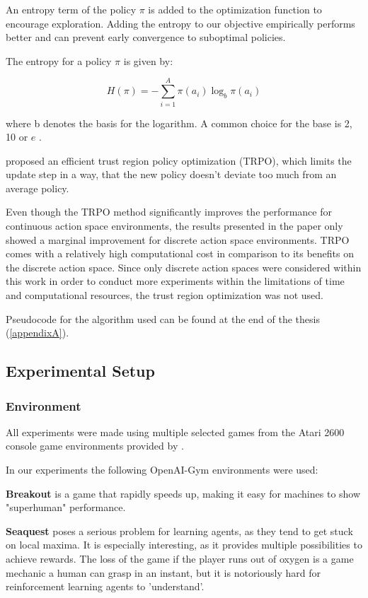 An entropy term of the policy $\pi$ is added to the optimization function to encourage exploration. 
Adding the entropy to our objective empirically performs better and can prevent early convergence to suboptimal policies.

The entropy for a policy $\pi$ is given by:

\begin{equation}
H(\pi) = -\sum^A_{i=1} \pi(a_i)\log_b \pi(a_i)
\end{equation}

where b denotes the basis for the logarithm. A common choice for the base is 2, 10 or $e$ \citep{entropy}.

\citet{ACER} proposed an efficient trust region policy optimization (TRPO), which limits the update step in a way, that the new policy doesn't deviate too much from an average policy. 

Even though the TRPO method significantly improves the performance for continuous action space environments, the results presented in the paper only showed a marginal improvement for discrete action space environments.
TRPO comes with a relatively high computational cost in comparison to its benefits on the discrete action space.
Since only discrete action spaces were considered within this work in order to conduct more experiments within the limitations of time and computational resources, the trust region optimization was not used.

Pseudocode for the algorithm used can be found at the end of the thesis (\ref{appendixA}).

\subsection{Experimental Setup}

\subsubsection{Environment}
All experiments were made using multiple selected games from the Atari 2600 console game environments provided by \citet{openaigym}.

In our experiments the following OpenAI-Gym environments were used:

\textbf{Breakout} is a game that rapidly speeds up, making it easy for machines to show "superhuman" performance.

\textbf{Seaquest} poses a serious problem for learning agents, as they tend to get stuck on local maxima. It is especially interesting, as it provides multiple possibilities to achieve rewards.
The loss of the game if the player runs out of oxygen is a game mechanic a human can grasp in an instant, but it is notoriously hard for reinforcement learning agents to 'understand'.


